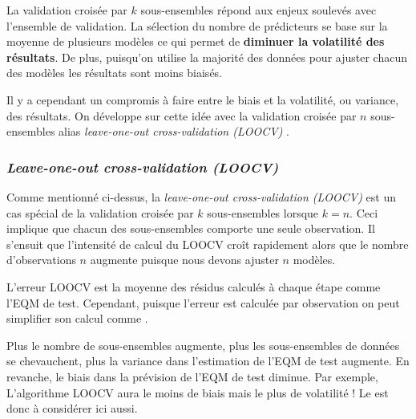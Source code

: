 \documentclass[french]{article}
\begin{document}
\begin{multicols*}{2}
\begin{rappel_enhanced}[Contexte]
La validation croisée par $k$ sous-ensembles répond aux enjeux soulevés avec l'ensemble de validation. La sélection du nombre de prédicteurs se base sur la moyenne de plusieurs modèles ce qui permet de \textbf{diminuer la volatilité des résultats}. De plus, puisqu'on utilise la majorité des données pour ajuster chacun des modèles les résultats sont moins biaisés.

\bigskip

Il y a cependant un compromis à faire entre le biais et la volatilité, ou variance, des résultats. On développe sur cette idée avec la validation croisée par $n$ sous-ensembles alias \og \textit{leave-one-out cross-validation (LOOCV)} \fg{}.
\end{rappel_enhanced}


\subsubsection{\og \textit{Leave-one-out cross-validation (LOOCV)} \fg{}}
\begin{rappel_enhanced}[Contexte]
Comme mentionné ci-dessus, la \og \textit{leave-one-out cross-validation (LOOCV)} \fg{} est un cas spécial de la validation croisée par $k$ sous-ensembles lorsque $k = n$. Ceci implique que chacun des sous-ensembles comporte une seule observation. Il s'ensuit que l'intensité de calcul du LOOCV croît rapidement alors que le nombre d'observations $n$ augmente puisque nous devons ajuster $n$ modèles.
\end{rappel_enhanced}

\bigskip

\begin{definitionNOHFILL}
L'erreur LOOCV est la moyenne des résidus calculés à chaque étape comme l'EQM de test. Cependant, puisque l'erreur est calculée par observation on peut simplifier son calcul comme . 
\end{definitionNOHFILL}

\begin{rappel_enhanced}[Limitations]
Plus le nombre de sous-ensembles augmente, plus les sous-ensembles de données se chevauchent, plus la variance dans l'estimation de l'EQM de test augmente. En revanche, le biais dans la prévision de l'EQM de test diminue. Par exemple, L'algorithme LOOCV aura le moins de biais mais le plus de volatilité ! Le \textit{\underline{}} est donc à considérer ici aussi. 


\end{rappel_enhanced}
\end{multicols*}
\end{document}
